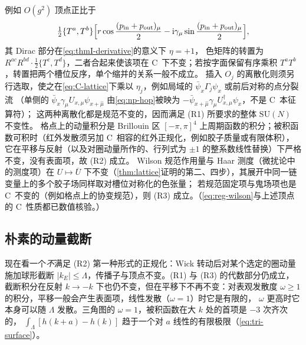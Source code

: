 \documentclass[UTF8,a4paper,11pt,fontset=fandol]{ctexart}
\theoremstyle{cplain}
\theoremstyle{cdefinition}
\theoremstyle{cremark}
\numberwithin{equation}{section}
\newcommand{\ii}{\mathrm{i}}                        %
\begin{document}
例如 $O(g^2)$ 顶点正比于
\[
\tfrac12\{T^a,T^b\}\Bigl[r\cos\frac{(p_{\mathrm{in}}+p_{\mathrm{out}})_\mu}{2}-\ii\gamma_\mu\sin\frac{(p_{\mathrm{in}}+p_{\mathrm{out}})_\mu}{2}\Bigr],
\]
其 Dirac 部分在\cref{eq:thmI-derivative}的意义下 $\eta=+1$，
色矩阵的转置为 $R^{ac}R^{bd}\cdot\frac12\{T^c,T^d\}$，二者合起来使该项在 C~下不变；若按字面保留有序乘积 $T^aT^b$，转置把两个槽位反序，单个缩并的关系一般不成立。
插入 $O_j$ 的离散化则须另行选取，使之在\cref{eq:C-lattice}下乘以 $\eta_j$，例如局域的 $\bar\psi_x\Gamma_j\psi_x$ 或前后对称的点分裂流
（单侧的 $\bar\psi_x\gamma_\mu U_{x,\mu}\psi_{x+\hat\mu}$ 由\cref{eq:np-hop}被映为 $-\bar\psi_{x+\hat\mu}\gamma_\mu U^\dagger_{x,\mu}\psi_x$，不是 C~本征算符）；
这两种离散化都是规范不变的，因而满足 (R1) 所要求的整体 $\mathrm{SU}(N)$ 不变性。
格点上的动量积分是 Brillouin 区 $[-\pi,\pi]^4$ 上周期函数的积分；被积函数可积时（红外发散须另加 C~相容的红外正规化，例如胶子质量或有限体积），
它在平移与反射（以及对圈动量所作的、行列式为 $\pm1$ 的整系数线性替换）下严格不变，没有表面项，故 (R2) 成立。
Wilson 规范作用量与 Haar 测度（微扰论中的测度项）在 $U\mapsto\overline U$ 下不变（\cref{thm:lattice}证明的第二、四步），其展开中同一链变量上的多个胶子场同样取对槽位对称化的色张量；
若规范固定项与鬼场项也是 C~不变的（例如格点上的协变规范），则 (R3) 成立。（\cref{eq:reg-wilson}与上述顶点的 C~性质都已数值核验。）

\subsection{朴素的动量截断}\label{sec:reg-cutoff}

现在看一个\emph{不}满足 (R2) 第一种形式的正规化：Wick 转动后对某个选定的圈动量施加球形截断 $|k_E|\le\Lambda$，传播子与顶点不变。(R1) 与 (R3) 的代数部分仍成立，
截断积分在反射 $k\to-k$ 下也仍不变，但在平移下不再不变：对表观发散度 $\omega\ge1$ 的积分，平移一般会产生表面项，线性发散（$\omega=1$）时它是有限的，
$\omega$ 更高时它本身可以随 $\Lambda$ 发散。三角图的 $\omega=1$，被积函数在大 $k$ 处的首项是 $-3$ 次齐次的，
$\int_\Lambda[h(k+a)-h(k)]$ 趋于一个对 $a$ 线性的有限极限（\cref{eq:tri-surface}）。
\end{document}
